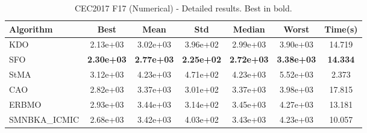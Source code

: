 \begin{table}[H]
\centering\small
\caption{CEC2017 F17 (Numerical) - Detailed results. Best in bold.}
\label{tab:cec2017_F17}
\begin{tabular}{lcccccc}
\toprule
\textbf{Algorithm} & \textbf{Best} & \textbf{Mean} & \textbf{Std} & \textbf{Median} & \textbf{Worst} & \textbf{Time(s)} \\
\midrule
KDO & 2.13e+03 & 3.02e+03 & 3.96e+02 & 2.99e+03 & 3.90e+03 & 14.719 \\
SFO & \textbf{2.30e+03} & \textbf{2.77e+03} & \textbf{2.25e+02} & \textbf{2.72e+03} & \textbf{3.38e+03} & \textbf{14.334} \\
StMA & 3.12e+03 & 4.23e+03 & 4.71e+02 & 4.23e+03 & 5.52e+03 & 2.373 \\
CAO & 2.82e+03 & 3.37e+03 & 3.01e+02 & 3.37e+03 & 3.98e+03 & 17.815 \\
ERBMO & 2.93e+03 & 3.44e+03 & 3.14e+02 & 3.45e+03 & 4.27e+03 & 13.181 \\
SMNBKA_ICMIC & 2.68e+03 & 3.42e+03 & 4.03e+02 & 3.43e+03 & 4.23e+03 & 10.057 \\
\bottomrule
\end{tabular}
\end{table}
